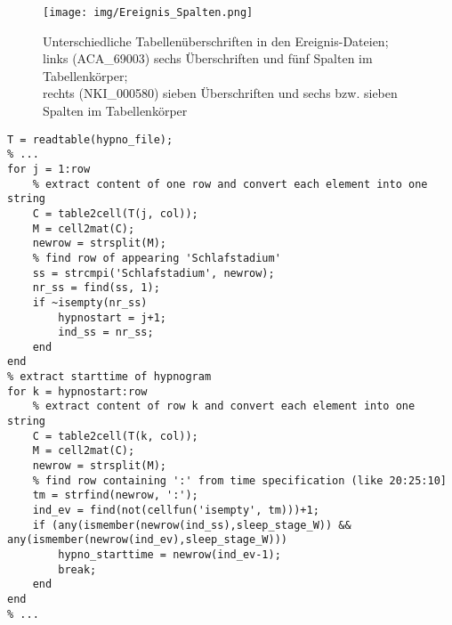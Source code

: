 \begin{figure}[H]
	\centering
	\texttt{[image: img/Ereignis\_Spalten.png]}
	\caption[Tabellenüberschriften in den Ereignis-Dateien]{Unterschiedliche Tabellenüberschriften in den Ereignis-Dateien;\\links (ACA\_69003) sechs Überschriften und fünf Spalten im Tabellenkörper;\\rechts (NKI\_000580) sieben Überschriften und sechs bzw. sieben Spalten im Tabellenkörper}
	\label{fig:spalten}
\end{figure}

\begin{lstlisting}[caption={Implementierung Kriterium D1 im Matlab-Skript ma\_restructure\_hypnogram.m}, label={lst:D1}]
T = readtable(hypno_file);
% ...
for j = 1:row
    % extract content of one row and convert each element into one string
    C = table2cell(T(j, col));
    M = cell2mat(C);
    newrow = strsplit(M);
    % find row of appearing 'Schlafstadium'
    ss = strcmpi('Schlafstadium', newrow);
    nr_ss = find(ss, 1);
    if ~isempty(nr_ss)
        hypnostart = j+1;
        ind_ss = nr_ss;
    end
end
% extract starttime of hypnogram
for k = hypnostart:row
    % extract content of row k and convert each element into one string
    C = table2cell(T(k, col));
    M = cell2mat(C);
    newrow = strsplit(M);
    % find row containing ':' from time specification (like 20:25:10]
    tm = strfind(newrow, ':');
    ind_ev = find(not(cellfun('isempty', tm)))+1;
    if (any(ismember(newrow(ind_ss),sleep_stage_W)) && any(ismember(newrow(ind_ev),sleep_stage_W)))
        hypno_starttime = newrow(ind_ev-1);
        break;
    end
end
% ...
\end{lstlisting}

